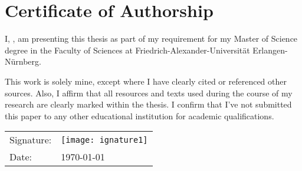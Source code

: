 \chapter*{Certificate of Authorship}

\makeatletter

I, \@author{}, am presenting this thesis as part of my requirement for my Master of Science degree in the Faculty of Sciences at Friedrich-Alexander-Universität Erlangen-Nürnberg. \makeatother

\vspace{6pt}

\noindent This work is solely mine, except where I have clearly cited
 or referenced other sources. Also, I affirm that all resources and texts used
  during the course of my research are clearly marked within the thesis. 
  I confirm that I've not submitted this paper to any other educational
   institution for academic qualifications.


\vspace{6pt}


\vspace{1cm}

\begin{tabular}{m{3cm}m{7cm}}
Signature: &\texttt{[image: ignature1]}\\

Date:	&\today\\
\end{tabular}
\vspace{6pt}

\makeatletter


\makeatother
